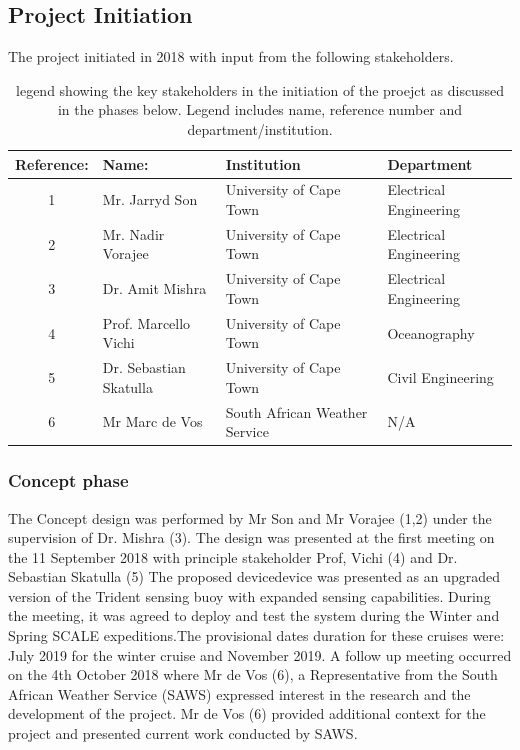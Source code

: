 

\subsection{Project Initiation}

The project initiated in 2018 with input from the following stakeholders.
\begin{table}[H]
    \centering
    \caption{legend showing the key stakeholders in the initiation of the proejct as discussed in the phases below. Legend includes name, reference number and department/institution. }
    \label{tab:proj_init_members}
    \begin{tabular}{||c|l|l|l||}
    \hline
        \textbf{Reference:} & \textbf{Name:} & \textbf{Institution} & \textbf{Department}  \\
        \hline
        1 & Mr. Jarryd Son & University of Cape Town & Electrical Engineering \\
        \hline
        2 & Mr. Nadir Vorajee & University of Cape Town & Electrical Engineering \\
        \hline
        3 & Dr. Amit Mishra & University of Cape Town & Electrical Engineering \\
        \hline
        4 & Prof. Marcello Vichi & University of Cape Town & Oceanography \\
        \hline
        5 & Dr. Sebastian Skatulla & University of Cape Town & Civil Engineering\\
        \hline
        6 & Mr Marc de Vos & South African Weather Service & N/A \\
        \hline
    \end{tabular}

\end{table}

\subsubsection{Concept phase}

The  Concept design was performed by Mr Son and Mr Vorajee (1,2) under the supervision of Dr. Mishra (3). The design was presented at the first meeting on the 11 September 2018 with principle stakeholder Prof, Vichi (4) and Dr. Sebastian Skatulla (5) The proposed devicedevice was presented as an upgraded version of the Trident sensing buoy with expanded sensing capabilities. During the meeting, it was agreed to deploy and test the system during the Winter and Spring SCALE expeditions.The provisional dates duration for these cruises were: July 2019 for the winter cruise and November 2019. A follow up meeting occurred on the 4th October 2018 where Mr de Vos (6), a Representative from the South African Weather Service (SAWS) expressed interest in the research and the development of the project. Mr de Vos (6) provided additional context for the project and presented current work conducted by SAWS.

